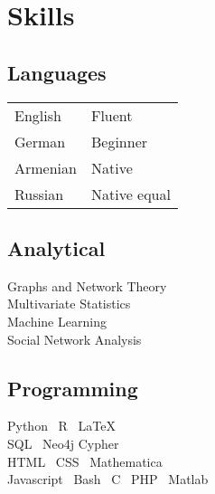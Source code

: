 \documentclass[]{vn-resume}
\newcommand*\bul{\textbullet{}}
\begin{document}
\begin{minipage}[t]{0.3\textwidth}
    
    
    
    \section{Skills}
    
    \subsection{Languages}
    \begin{tabular}{@{}ll}
        English   &  Fluent \\
        German    &  Beginner \\
        Armenian  &  Native \\
        Russian   &  Native equal
    \end{tabular}
    \sectionsep
    
    \subsection{Analytical}
    Graphs and Network Theory \\ 
    Multivariate Statistics \\
    Machine Learning \\    
    Social Network Analysis \\
    \sectionsep
    

    \subsection{Programming}
    Python \bul\ R \bul\ \LaTeX\ \\
    SQL \bul\ Neo4j Cypher \\
    HTML \bul\ CSS \bul\ Mathematica\\    
    Javascript \bul\ Bash \bul\ C \bul\ PHP \bul\ Matlab
    \sectionsep


\end{minipage}
\end{document}
